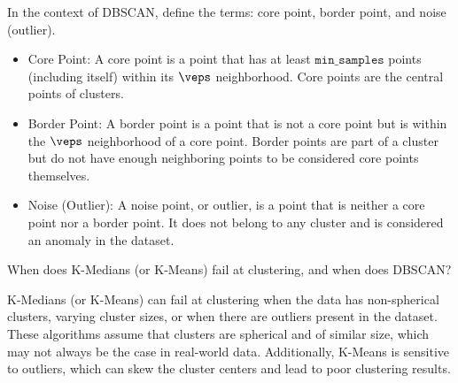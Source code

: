 \begin{ejercicio}
    In the context of DBSCAN, define the terms: core point, border point, and noise (outlier).
    \begin{itemize}
        \item Core Point: A core point is a point that has at least $\texttt{min\_samples}$ points (including itself) within its $\veps$ neighborhood. Core points are the central points of clusters.
        \item Border Point: A border point is a point that is not a core point but is within the $\veps$ neighborhood of a core point. Border points are part of a cluster but do not have enough neighboring points to be considered core points themselves.
        \item Noise (Outlier): A noise point, or outlier, is a point that is neither a core point nor a border point. It does not belong to any cluster and is considered an anomaly in the dataset.
    \end{itemize}
\end{ejercicio}

\begin{ejercicio}
    When does K-Medians (or K-Means) fail at clustering, and when does DBSCAN?

    K-Medians (or K-Means) can fail at clustering when the data has non-spherical clusters, varying cluster sizes, or when there are outliers present in the dataset. These algorithms assume that clusters are spherical and of similar size, which may not always be the case in real-world data. Additionally, K-Means is sensitive to outliers, which can skew the cluster centers and lead to poor clustering results.
\end{ejercicio}